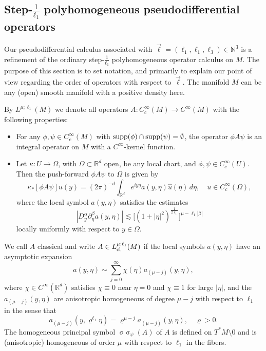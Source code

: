 \documentclass[reqno]{amsart}
\numberwithin{equation}{section}
\theoremstyle{definition}
\def\N{\mathbb N}
\def\R{\mathbb R}
\DeclareMathOperator{\sym}{ \sigma\!\!\!\sigma}
\begin{document}
\subsection{{\boldmath Step-$\frac{1}{\ell_1}$} polyhomogeneous pseudodifferential operators}\label{step1lcalc}

Our pseudodifferential calculus associated with $\vec{\ell} = (\ell_1,\ell_1,\ell_3) \in \N^3$ is a refinement of the ordinary step-$\frac{1}{\ell_1}$ polyhomogeneous operator calculus on $M$. The purpose of this section is to set notation, and primarily to explain our point of view regarding the order of operators with respect to $\vec{\ell}$. The manifold $M$ can be any (open) smooth manifold with a positive density here.

By $L^{\mu;\ell_1}(M)$ we denote all operators $A : C_c^{\infty}(M) \to C^{\infty}(M)$ with the following properties:
\begin{itemize}
\item For any $\phi,\psi \in C_c^{\infty}(M)$ with $\textup{supp}(\phi)\cap\textup{supp}(\psi) = \emptyset$, the operator $\phi A \psi$ is an integral operator on $M$ with a $C^{\infty}$-kernel function.
\item Let $\kappa : U \to \Omega$, with $\Omega \subset \R^d$ open, be any local chart, and $\phi,\psi \in C_c^{\infty}(U)$. Then the push-forward $\phi A \psi$ to $\Omega$ is given by
$$
\kappa_*[\phi A \psi] u(y) = (2\pi)^{-d} \int_{\R^d} e^{iy\eta}a(y,\eta)\hat{u}(\eta)\,d\eta,  \quad u \in C_c^{\infty}(\Omega),
$$
where the local symbol $a(y,\eta)$ satisfies the estimates
$$
|D^{\alpha}_y\partial^{\beta}_{\eta}a(y,\eta)| \lesssim \big[(1 + |\eta|^{2})^{\frac{1}{2\ell_1}}\bigr]^{\mu - \ell_1|\beta|}
$$
locally uniformly with respect to $y \in \Omega$.
\end{itemize}
We call $A$ classical and write $A \in L_{\textup{cl}}^{\mu;\ell_1}(M)$ if the local symbols $a(y,\eta)$ have an asymptotic expansion
$$
a(y,\eta) \sim \sum\limits_{j=0}^{\infty}\chi(\eta)a_{(\mu-j)}(y,\eta),
$$
where $\chi \in C^{\infty}(\R^d)$ satisfies $\chi \equiv 0$ near $\eta = 0$ and $\chi \equiv 1$ for large $|\eta|$, and the $a_{(\mu-j)}(y,\eta)$ are anisotropic homogeneous of degree $\mu-j$ with respect to $\ell_1$ in the sense that
$$
a_{(\mu-j)}(y,\varrho^{\ell_1}\eta) = \varrho^{\mu-j}a_{(\mu-j)}(y,\eta), \quad \varrho > 0.
$$
The homogeneous principal symbol $\sym_{\psi}(A)$ of $A$ is defined on $T^*M\setminus 0$ and is (anisotropic) homogeneous of order $\mu$ with respect to $\ell_1$ in the fibers.
\end{document}
